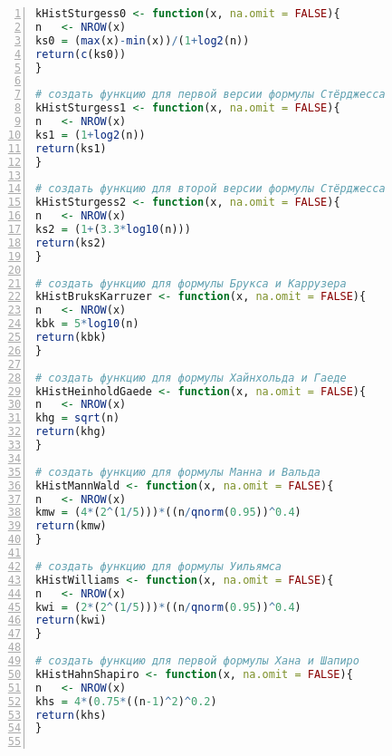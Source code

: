 \documentclass[]{scrartcl}
\begin{document}
\begin{lstlisting}[caption = Создание функций для~автоматизированного определения оптимального значения k, firstnumber=1, language = R, firstnumber=1, numbers=left, numberstyle=\tiny, stepnumber=2, numbersep=5pt, label= lis:optimal-k-R]
kHistSturgess0 <- function(x, na.omit = FALSE){
n   <- NROW(x)
ks0 = (max(x)-min(x))/(1+log2(n)) 
return(c(ks0))                              
}                                               

# создать функцию для первой версии формулы Стёрджесса
kHistSturgess1 <- function(x, na.omit = FALSE){ 
n   <- NROW(x)                              
ks1 = (1+log2(n))                             
return(ks1)                                     
}                                                             

# создать функцию для второй версии формулы Стёрджесса
kHistSturgess2 <- function(x, na.omit = FALSE){ 
n   <- NROW(x)                                
ks2 = (1+(3.3*log10(n)))                     
return(ks2)                                   
}                                             

# создать функцию для формулы Брукса и Каррузера
kHistBruksKarruzer <- function(x, na.omit = FALSE){ 
n   <- NROW(x)                                    
kbk = 5*log10(n)                                  
return(kbk)                                       
}                                                   

# создать функцию для формулы Хайнхольда и Гаеде
kHistHeinholdGaede <- function(x, na.omit = FALSE){ 
n   <- NROW(x)                                    
khg = sqrt(n)                                     
return(khg)                                      
}                                                   

# создать функцию для формулы Манна и Вальда
kHistMannWald <- function(x, na.omit = FALSE){ 
n   <- NROW(x)                               
kmw = (4*(2^(1/5)))*((n/qnorm(0.95))^0.4)   
return(kmw)                                   
}                                             

# создать функцию для формулы Уильямса
kHistWilliams <- function(x, na.omit = FALSE){ 
n   <- NROW(x)                               
kwi = (2*(2^(1/5)))*((n/qnorm(0.95))^0.4)    
return(kwi)                                   
}                                            

# создать функцию для первой формулы Хана и Шапиро
kHistHahnShapiro <- function(x, na.omit = FALSE){ 
n   <- NROW(x)                                 
khs = 4*(0.75*((n-1)^2)^0.2)                   
return(khs)                                   
}                                                 


\end{lstlisting}
\end{document}
